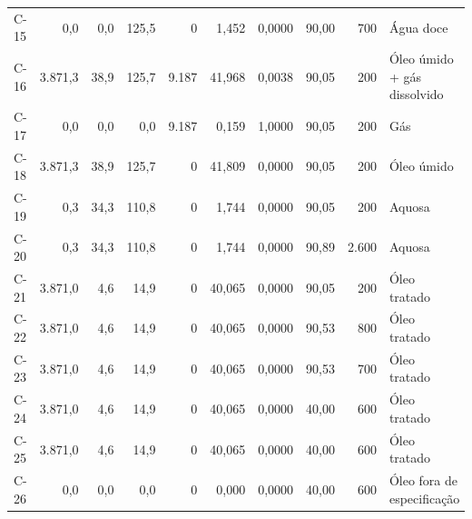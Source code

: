 \documentclass[11pt,a4paper]{article}
\numberwithin{equation}{section}
\numberwithin{table}{section}
\numberwithin{figure}{section}
\begin{document}
{\begin{longtable}{lrrrrrrrrL{2.5cm}}
C-15 & 0,0 & 0,0 & 125,5 & 0 & 1,452 & 0,0000 & 90,00 & 700 & {\scriptsize Água doce}\\
C-16 & 3.871,3 & 38,9 & 125,7 & 9.187 & 41,968 & 0,0038 & 90,05 & 200 & {\scriptsize Óleo úmido + gás dissolvido}\\
C-17 & 0,0 & 0,0 & 0,0 & 9.187 & 0,159 & 1,0000 & 90,05 & 200 & {\scriptsize Gás}\\
C-18 & 3.871,3 & 38,9 & 125,7 & 0 & 41,809 & 0,0000 & 90,05 & 200 & {\scriptsize Óleo úmido}\\
C-19 & 0,3 & 34,3 & 110,8 & 0 & 1,744 & 0,0000 & 90,05 & 200 & {\scriptsize Aquosa}\\
C-20 & 0,3 & 34,3 & 110,8 & 0 & 1,744 & 0,0000 & 90,89 & 2.600 & {\scriptsize Aquosa}\\
C-21 & 3.871,0 & 4,6 & 14,9 & 0 & 40,065 & 0,0000 & 90,05 & 200 & {\scriptsize Óleo tratado}\\
C-22 & 3.871,0 & 4,6 & 14,9 & 0 & 40,065 & 0,0000 & 90,53 & 800 & {\scriptsize Óleo tratado}\\
C-23 & 3.871,0 & 4,6 & 14,9 & 0 & 40,065 & 0,0000 & 90,53 & 700 & {\scriptsize Óleo tratado}\\
C-24 & 3.871,0 & 4,6 & 14,9 & 0 & 40,065 & 0,0000 & 40,00 & 600 & {\scriptsize Óleo tratado}\\
C-25 & 3.871,0 & 4,6 & 14,9 & 0 & 40,065 & 0,0000 & 40,00 & 600 & {\scriptsize Óleo tratado}\\
C-26 & 0,0 & 0,0 & 0,0 & 0 & 0,000 & 0,0000 & 40,00 & 600 & {\scriptsize Óleo fora de especificação}\\
\bottomrule\end{longtable}}
\clearpage
\end{document}
